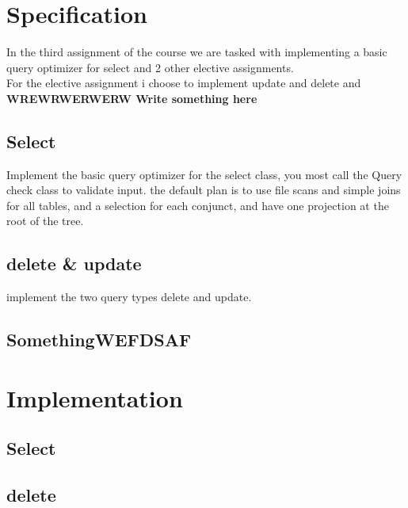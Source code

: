 \documentclass[a4paper,10pt,titlepage]{report}
\begin{document}
\section{Specification}
In the third assignment of the course we are tasked with implementing a basic query optimizer for select and 2 other elective assignments.\\

For the elective assignment i choose to implement update and delete and \textbf{WREWRWERWERW Write something here}


\subsection{Select}
Implement the basic query optimizer for the select class, you most call the Query check class to validate input. the default plan is to use file scans and simple joins for all tables, and a selection for each conjunct, and have one projection at the root of the tree.

\subsection{delete \& update }

implement the two query types delete and update.

\subsection{SomethingWEFDSAF}



%

\section{Implementation}

\subsection{Select}


\subsection{delete}
\end{document}
